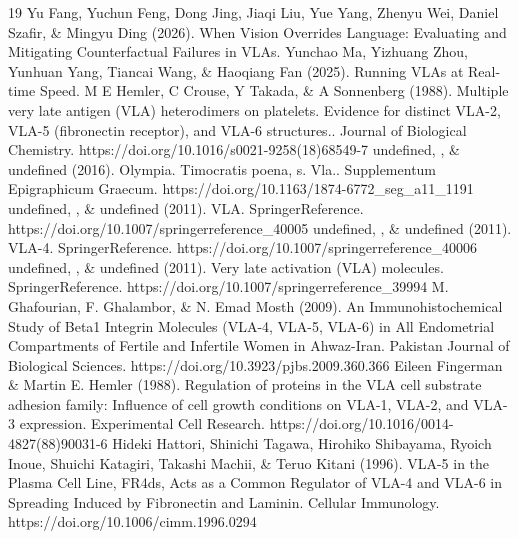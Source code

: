 \documentclass{article}
\begin{document}
\begin{thebibliography}{19}
 Yu Fang, Yuchun Feng, Dong Jing, Jiaqi Liu, Yue Yang, Zhenyu Wei, Daniel Szafir, \& Mingyu Ding (2026). When Vision Overrides Language: Evaluating and Mitigating Counterfactual Failures in VLAs.
 Yunchao Ma, Yizhuang Zhou, Yunhuan Yang, Tiancai Wang, \& Haoqiang Fan (2025). Running VLAs at Real-time Speed.
 M E Hemler, C Crouse, Y Takada, \& A Sonnenberg (1988). Multiple very late antigen (VLA) heterodimers on platelets. Evidence for distinct VLA-2, VLA-5 (fibronectin receptor), and VLA-6 structures.. Journal of Biological Chemistry. https://doi.org/10.1016/s0021-9258(18)68549-7
 undefined, , \& undefined (2016). Olympia. Timocratis poena, s. Vla.. Supplementum Epigraphicum Graecum. https://doi.org/10.1163/1874-6772\_seg\_a11\_1191
 undefined, , \& undefined (2011). VLA. SpringerReference. https://doi.org/10.1007/springerreference\_40005
 undefined, , \& undefined (2011). VLA-4. SpringerReference. https://doi.org/10.1007/springerreference\_40006
 undefined, , \& undefined (2011). Very late activation (VLA) molecules. SpringerReference. https://doi.org/10.1007/springerreference\_39994
 M. Ghafourian, F. Ghalambor, \& N. Emad Mosth (2009). An Immunohistochemical Study of Beta1 Integrin Molecules (VLA-4, VLA-5, VLA-6) in All Endometrial Compartments of Fertile and Infertile Women in Ahwaz-Iran. Pakistan Journal of Biological Sciences. https://doi.org/10.3923/pjbs.2009.360.366
 Eileen Fingerman \& Martin E. Hemler (1988). Regulation of proteins in the VLA cell substrate adhesion family: Influence of cell growth conditions on VLA-1, VLA-2, and VLA-3 expression. Experimental Cell Research. https://doi.org/10.1016/0014-4827(88)90031-6
 Hideki Hattori, Shinichi Tagawa, Hirohiko Shibayama, Ryoich Inoue, Shuichi Katagiri, Takashi Machii, \& Teruo Kitani (1996). VLA-5 in the Plasma Cell Line, FR4ds, Acts as a Common Regulator of VLA-4 and VLA-6 in Spreading Induced by Fibronectin and Laminin. Cellular Immunology. https://doi.org/10.1006/cimm.1996.0294
\end{thebibliography}
\end{document}
